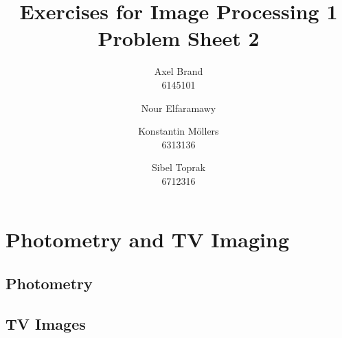 \documentclass[a4paper]{article}
\title{\textbf{Exercises for Image Processing 1}\\Problem Sheet 2}
\author{Axel Brand\\6145101 \and Nour Elfaramawy\\ \and Konstantin M\"ollers\\6313136 \and Sibel Toprak\\6712316}
\begin{document}
	\maketitle
	
	\section{Photometry and TV Imaging}
	
	\subsection{Photometry}
	
	\subsection{TV Images}
\end{document}
